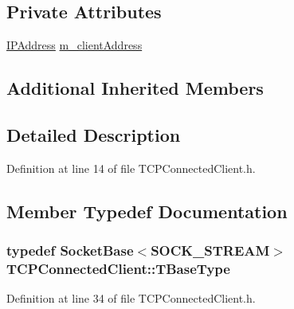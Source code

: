 \subsection*{Private Attributes}
\begin{DoxyCompactItemize}
\item 
\hyperlink{class_i_p_address}{I\-P\-Address} \hyperlink{class_t_c_p_connected_client_a7ef3342e4792893fa7c653a5f1a02ffe}{m\-\_\-client\-Address}
\end{DoxyCompactItemize}
\subsection*{Additional Inherited Members}


\subsection{Detailed Description}


Definition at line 14 of file T\-C\-P\-Connected\-Client.\-h.



\subsection{Member Typedef Documentation}
\hypertarget{class_t_c_p_connected_client_a8f789adb85d13f662bc739ac7979e270}{
\subsubsection[{T\-Base\-Type}]{\setlength{\rightskip}{0pt plus 5cm}typedef {\bf Socket\-Base}$<$S\-O\-C\-K\-\_\-\-S\-T\-R\-E\-A\-M$>$ {\bf T\-C\-P\-Connected\-Client\-::\-T\-Base\-Type}\hspace{0.3cm}{\ttfamily [private]}}}\label{class_t_c_p_connected_client_a8f789adb85d13f662bc739ac7979e270}


Definition at line 34 of file T\-C\-P\-Connected\-Client.\-h.



